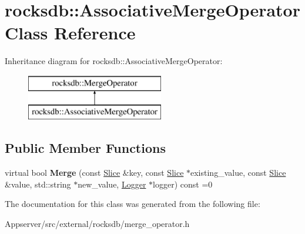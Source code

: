 \hypertarget{classrocksdb_1_1AssociativeMergeOperator}{}\section{rocksdb\+:\+:Associative\+Merge\+Operator Class Reference}
\label{classrocksdb_1_1AssociativeMergeOperator}
Inheritance diagram for rocksdb\+:\+:Associative\+Merge\+Operator\+:\begin{figure}[H]
\begin{center}
\leavevmode
\includegraphics[height=2.000000cm]{classrocksdb_1_1AssociativeMergeOperator}
\end{center}
\end{figure}
\subsection*{Public Member Functions}
\begin{DoxyCompactItemize}
\item 
virtual bool {\bfseries Merge} (const \hyperlink{classrocksdb_1_1Slice}{Slice} \&key, const \hyperlink{classrocksdb_1_1Slice}{Slice} $\ast$existing\+\_\+value, const \hyperlink{classrocksdb_1_1Slice}{Slice} \&value, std\+::string $\ast$new\+\_\+value, \hyperlink{classrocksdb_1_1Logger}{Logger} $\ast$logger) const =0\hypertarget{classrocksdb_1_1AssociativeMergeOperator_a9a51ddbc04ad52a4ea4d15b252bead44}{}\label{classrocksdb_1_1AssociativeMergeOperator_a9a51ddbc04ad52a4ea4d15b252bead44}

\end{DoxyCompactItemize}


The documentation for this class was generated from the following file\+:\begin{DoxyCompactItemize}
\item 
Appserver/src/external/rocksdb/merge\+\_\+operator.\+h\end{DoxyCompactItemize}

